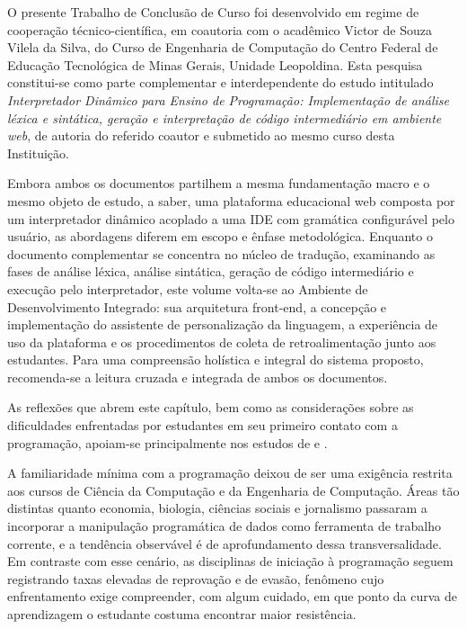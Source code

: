 \label{cap:introducao_modelo}

O presente Trabalho de Conclusão de Curso foi desenvolvido em regime de cooperação técnico-científica, em coautoria com o acadêmico Victor de Souza Vilela da Silva, do Curso de Engenharia de Computação do Centro Federal de Educação Tecnológica de Minas Gerais, Unidade Leopoldina. Esta pesquisa constitui-se como parte complementar e interdependente do estudo intitulado \textit{Interpretador Dinâmico para Ensino de Programação: Implementação de análise léxica e sintática, geração e interpretação de código intermediário em ambiente web}, de autoria do referido coautor e submetido ao mesmo curso desta Instituição.

Embora ambos os documentos partilhem a mesma fundamentação macro e o mesmo objeto de estudo, a saber, uma plataforma educacional web composta por um interpretador dinâmico acoplado a uma IDE com gramática configurável pelo usuário, as abordagens diferem em escopo e ênfase metodológica. Enquanto o documento complementar se concentra no núcleo de tradução, examinando as fases de análise léxica, análise sintática, geração de código intermediário e execução pelo interpretador, este volume volta-se ao Ambiente de Desenvolvimento Integrado: sua arquitetura front-end, a concepção e implementação do assistente de personalização da linguagem, a experiência de uso da plataforma e os procedimentos de coleta de retroalimentação junto aos estudantes. Para uma compreensão holística e integral do sistema proposto, recomenda-se a leitura cruzada e integrada de ambos os documentos.

As reflexões que abrem este capítulo, bem como as considerações sobre as dificuldades enfrentadas por estudantes em seu primeiro contato com a programação, apoiam-se principalmente nos estudos de  e .

A familiaridade mínima com a programação deixou de ser uma exigência restrita aos cursos de Ciência da Computação e da Engenharia de Computação. Áreas tão distintas quanto economia, biologia, ciências sociais e jornalismo passaram a incorporar a manipulação programática de dados como ferramenta de trabalho corrente, e a tendência observável é de aprofundamento dessa transversalidade. Em contraste com esse cenário, as disciplinas de iniciação à programação seguem registrando taxas elevadas de reprovação e de evasão, fenômeno cujo enfrentamento exige compreender, com algum cuidado, em que ponto da curva de aprendizagem o estudante costuma encontrar maior resistência.

